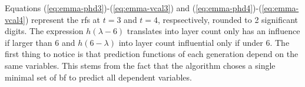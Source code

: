 Equations (\ref{eq:emma-phd3})-(\ref{eq:emma-vcal3}) and (\ref{eq:emma-phd4})-(\ref{eq:emma-vcal4}) represent the \gls{rf}s at $t=3$ and $t=4$, respsectively, rounded to 2 significant digits.
The expression $h(\lambda-6)$ translates into layer count only has an influence if larger than 6 
and $h(6-\lambda)$ into layer count influential only if under 6.
%
The first thing to notice is that prediction functions of each generation depend on the same variables. 
This stems from the fact that the algorithm choses a single minimal set of \gls{bf} to predict all dependent variables. 
%

